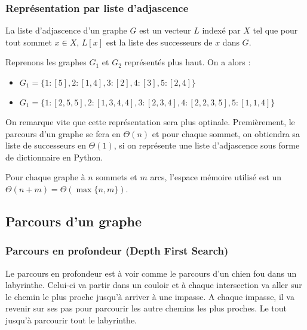 \subsubsection{Représentation par liste d'adjascence}

\begin{definition}
    La liste d'adjascence d'un graphe $G$ est un vecteur $L$ indexé par $X$ tel que pour tout sommet $x \in X$,
    $L[x]$ est la liste des successeurs de $x$ dans $G$.
\end{definition}

\begin{example}
    Reprenons les graphes $G_1$ et $G_2$ représentés plus haut. On a alors :
    \begin{itemize}
        \item $G_1 = \{1 : [5],2 : [1,4],3 : [2],4 : [3],5 : [2,4]\}$
        \item $ G_1 = \{1 : [2,5,5],2 : [1,3,4,4],3 : [2,3,4],4 : [2,2,3,5],5 : [1,1,4]\}$
    \end{itemize}
\end{example}

\begin{remark}
    On remarque vite que cette représentation sera plus optinale. Premièrement, le parcours d'un graphe se fera en $\Theta(n)$ 
    et pour chaque sommet, on obtiendra sa liste de successeurs en $\Theta(1)$, si on représente une liste d'adjascence sous forme de dictionnaire en Python.
\end{remark}

\begin{prop}
    Pour chaque graphe à $n$ sommets et $m$ arcs, l'espace mémoire utilisé est un $\Theta(n+m) = \Theta (\max \{n,m\})$.
\end{prop}


\subsection{Parcours d'un graphe}

\subsubsection{Parcours en profondeur (Depth First Search)}

Le parcours en profondeur est à voir comme le parcours d'un chien fou dans un labyrinthe.
Celui-ci va partir dans un couloir et à chaque intersection va aller sur le chemin le plus proche jusqu'à arriver à une impasse.
A chaque impasse, il va revenir sur ses pas pour parcourir les autre chemins les plus proches. Le tout jusqu'à parcourir tout le labyrinthe.

